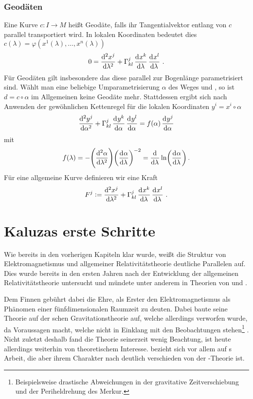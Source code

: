 \subsection{Geodäten}
Eine Kurve $c:I\to M$ heißt Geodäte, falls ihr Tangentialvektor entlang von 
$c$ parallel transportiert wird. In lokalen Koordinaten bedeutet dies 
$c(\lambda)=\varphi(x^1(\lambda),\dots, x^n(\lambda))$ 
\begin{equation}
0=\dod[2]{x^j}{\lambda}+\Gamma^{j}_{kl}\dod{x^k}{\lambda}\dod{x^l}{\lambda}\,.
\end{equation}
Für Geodäten gilt insbesondere das diese parallel zur Bogenlänge parametrisiert
sind. Wählt man eine beliebige Umparametrisierung  $\alpha$ des Weges 
und , so ist $d=c\circ \alpha$ im Allgemeinen keine
Geodäte mehr. Stattdessen ergibt sich nach Anwenden der gewöhnlichen Kettenregel
für die lokalen Koordinaten $y^i=x^i\circ\alpha$
\begin{equation}
\dod[2]{y^j}{\alpha}+\Gamma^{j}_{kl}\dod{y^k}{\alpha}\dod{y^l}{\alpha}
=f(\alpha)\dod{y^j}{\alpha}
\end{equation}
mit 
\begin{equation}
f(\lambda)
 =-\left(\dod[2]{\alpha}{\lambda}\right)\left(\dod{\alpha}{\lambda}\right)^{-2}
 =\dod{}{\lambda}\ln\left(\dod{\alpha}{\lambda}\right)\,.
\end{equation}
Für eine allgemeine Kurve definieren wir eine Kraft
\begin{equation}
F^j:=\dod[2]{x^j}{\lambda}+\Gamma^{j}_{kl}\dod{x^k}{\lambda}\dod{x^l}{\lambda}\,.
\end{equation}
\chapter{Kaluzas erste Schritte}
Wie bereits in den vorherigen Kapiteln klar wurde, weißt die Struktur von
Elektromagnetismus und allgemeiner Relativitätstheorie deutliche Parallelen auf.
Dies wurde bereits in den ersten Jahren nach der Entwicklung der
allgemeinen Relativitätstheorie untersucht und mündete
unter anderem in Theorien von \cite{weyl1918gravitation} und
 \cite{nordstrom1914moglichkeit}.

Dem Finnen  gebührt dabei die Ehre, als Erster den
Elektromagnetismus als Phänomen einer fünfdimensionalen Raumzeit zu deuten.
Dabei baute seine Theorie auf der schen Gravitationstheorie
auf, welche allerdings verworfen wurde, da Voraussagen macht, welche nicht in
Einklang mit den Beobachtungen stehen\footnote{Beispielsweise drastische
Abweichungen in der gravitative Zeitverschiebung und der Periheldrehung des
Merkur.} .
Nicht zuletzt deshalb fand die Theorie seinerzeit wenig Beachtung, ist heute
allerdings weiterhin von theoretischem Interesse.
 bezieht sich vor allem auf s Arbeit, die aber ihrem
Charakter nach deutlich verschieden von der -Theorie ist.
